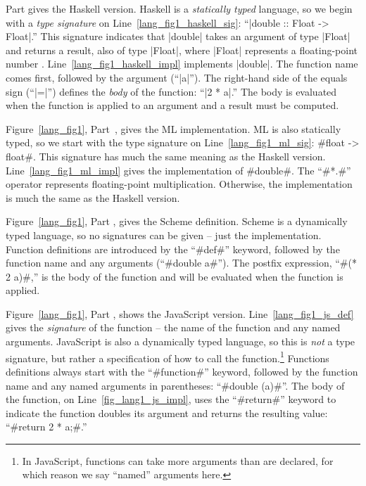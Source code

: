 \documentclass[12pt]{report}
\begin{document}
Part  gives the Haskell version. Haskell is
a \emph{statically typed} language, so we begin with a \emph{type
  signature} on Line~\ref{lang_fig1_haskell_sig}: ``|double :: Float ->
Float|.'' This signature indicates that |double| takes an argument of
type |Float| and returns a result, also of type |Float|, where |Float|
represents a floating-point number
\citep{HaskellReportXX}. Line~\ref{lang_fig1_haskell_impl} implements
|double|. The function name comes first, followed by the argument
(``|a|''). The right-hand side of the equals sign (``|=|'') defines the \emph{body} of the
function: ``|2 * a|.'' The body is evaluated when the function is applied
to an argument and a result must be computed.

Figure~\ref{lang_fig1}, Part~, gives the ML
implementation. ML is also statically typed, so we start with the type
signature on Line~\ref{lang_fig1_ml_sig}: #float -> float#. This
signature has much the same meaning as the Haskell
version. Line~\ref{lang_fig1_ml_impl} gives the implementation of
#double#. The ``#*.#'' operator represents floating-point
multiplication. Otherwise, the implementation is much the same as the
Haskell version.

Figure~\ref{lang_fig1}, Part , gives the
Scheme definition. Scheme is a dynamically typed language, so no
signatures can be given -- just the implementation. Function
definitions are introduced by the ``#def#'' keyword, followed by the
function name and any arguments (``#double a#'').  The postfix
expression, ``#(* 2 a)#,'' is the body of the function and will be
evaluated when the function is applied.

Figure~\ref{lang_fig1}, Part , shows the
JavaScript version. Line~\ref{lang_fig1_js_def} gives the
\emph{signature} of the function -- the name of the function and any
named arguments. JavaScript is also a dynamically typed language, so
this is \emph{not} a type signature, but rather a specification of how
to call the function.\footnote{In JavaScript, functions can take more
  arguments than are declared, for which reason we say ``named''
  arguments here.}  Functions definitions always start with the
``#function#'' keyword, followed by the function name and any
named arguments in parentheses: ``#double (a)#''. The body of the function,
on Line~\ref{fig_lang1_js_impl}, uses the ``#return#'' keyword to
indicate the function doubles its argument and returns the resulting
value: ``#return 2 * a;#.''
\end{document}
